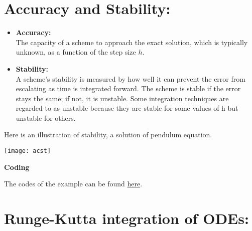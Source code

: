 \documentclass[11pt]{article}
\theoremstyle{definition}
\begin{document}
\section{Accuracy and Stability:}

\begin{itemize}
 \item {\bf Accuracy:}\\ The capacity of a scheme to approach the exact solution, which is typically unknown, as a function of the step size $h$.
 
 \item {\bf Stability:}\\ A scheme's stability is measured by how well it can prevent the error from escalating as time is integrated forward. The scheme is stable if the error stays the same; if not, it is unstable. Some integration techniques are regarded to as unstable because they are stable for some values of h but unstable for others.
\end{itemize}

Here is an illustration of stability, a solution of pendulum equation.
 
\begin{center} \texttt{[image: acst]} 
\end{center}

   \begin{shaded}
\textbf{Coding} 

  The codes of the example can be found \href{https://github.com/Phatimah/SSI2022/blob/main/week3/Implementations/Stability\%20and\%20accuracy.ipynb}{here}.
\end{shaded}

\section{Runge-Kutta integration of ODEs: }
\end{document}
